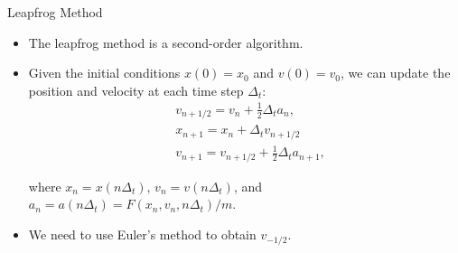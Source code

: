 \documentclass{beamer}
\begin{document}
\begin{frame}{Leapfrog Method}

  \begin{itemize}
    \item The leapfrog method is a second-order algorithm.
  \item  Given the initial conditions $x(0)=x_0$ and $v(0)=v_0$, we can update the position and velocity at each time step $\Delta_t$:
  \begin{align*}
    & v_{n+1 / 2}=v_n+\frac{1}{2} \Delta_t a_n, \\
    & x_{n+1}=x_n+\Delta_t v_{n+1 / 2} \\
    & v_{n+1}=v_{n+1 / 2}+\frac{1}{2} \Delta_t a_{n+1},
    \end{align*}
    
    where $x_n=x(n\Delta_t)$, $v_n=v(n\Delta_t)$, and $a_n=a(n\Delta_t)=F(x_n,v_n,n\Delta_t)/m$.
  
    \item We need to use Euler's method to obtain $v_{-1/2}$.
\end{itemize}

\end{frame}
\end{document}
